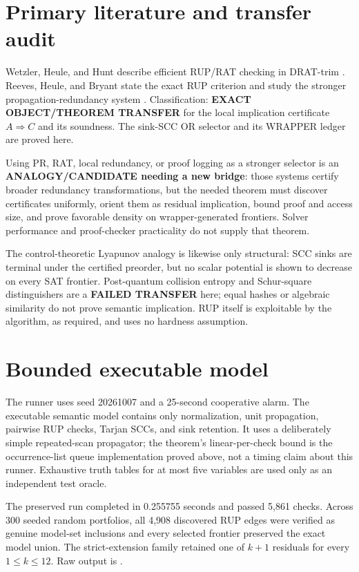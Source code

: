 \documentclass[11pt]{article}
\begin{document}
\section*{Primary literature and transfer audit}
Wetzler, Heule, and Hunt describe efficient RUP/RAT checking in DRAT-trim
\cite{wetzler2014drat}.  Reeves, Heule, and Bryant state the exact RUP
criterion and study the stronger propagation-redundancy system
\cite{reeves2023pr}.  Classification: \textbf{EXACT OBJECT/THEOREM
TRANSFER} for the local implication certificate $A\Rightarrow C$ and its
soundness.  The sink-SCC OR selector and its WRAPPER ledger are proved here.

Using PR, RAT, local redundancy, or proof logging as a stronger selector is
an \textbf{ANALOGY/CANDIDATE needing a new bridge}: those systems certify
broader redundancy transformations, but the needed theorem must discover
certificates uniformly, orient them as residual implication, bound proof and
access size, and prove favorable density on wrapper-generated frontiers.
Solver performance and proof-checker practicality do not supply that theorem.

The control-theoretic Lyapunov analogy is likewise only structural: SCC sinks
are terminal under the certified preorder, but no scalar potential is shown
to decrease on every SAT frontier.  Post-quantum collision entropy and
Schur-square distinguishers are a \textbf{FAILED TRANSFER} here; equal hashes
or algebraic similarity do not prove semantic implication.  RUP itself is
exploitable by the algorithm, as required, and uses no hardness assumption.

\section*{Bounded executable model}
The runner
 uses seed
20261007 and a 25-second cooperative alarm.  The executable semantic model
contains only normalization, unit propagation, pairwise RUP checks, Tarjan
SCCs, and sink retention.  It uses a deliberately simple repeated-scan
propagator; the theorem's linear-per-check bound is the occurrence-list queue
implementation proved above, not a timing claim about this runner.  Exhaustive
truth tables for at most five variables are used only as an independent test
oracle.

The preserved run completed in 0.255755 seconds and passed 5,861 checks.
Across 300 seeded random portfolios, all 4,908 discovered RUP edges were
verified as genuine model-set inclusions and every selected frontier preserved
the exact model union.  The strict-extension family retained one of
$k+1$ residuals for every $1\leq k\leq12$.  Raw output is
.
\end{document}
